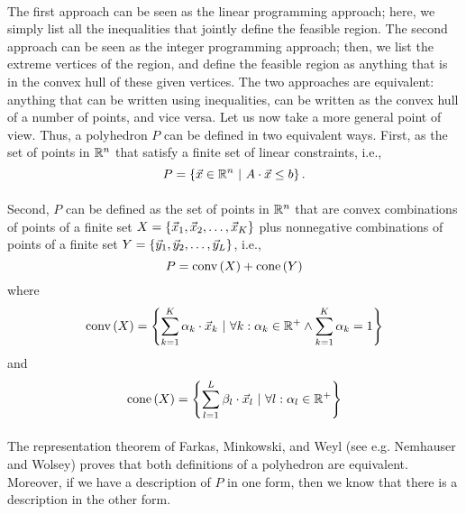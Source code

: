 \documentclass[titlepage]{book}
\theoremstyle{definition}
\begin{document}
\paragraph{}
The first approach can be seen as the linear programming approach; here, we simply list all the inequalities that jointly define the feasible region. The second approach can be seen as the integer programming approach; then, we list the extreme vertices of the region, and define the feasible region as anything that is in the convex hull of these given vertices. The two approaches are equivalent: anything that can be written using inequalities, can be written as the convex hull of a number of points, and vice versa. Let us now take a more general point of view. Thus, a polyhedron $P$ can be defined in two equivalent ways. First, as the set of points in $\RRR^n$ that satisfy a finite set of linear constraints, i.e.,
\begin{equation}
P=\condset{\vec{x}\in\RRR^n}{A\cdot\vec{x}\leq b}.
\end{equation}

\paragraph{}
Second, $P$ can be defined as the set of points in $\RRR^n$ that are convex combinations of points of a finite set $X=\accl{\vec{x}_1,\vec{x}_2,\ldots,\vec{x}_K}$ plus nonnegative combinations of points of a finite set $Y=\accl{\vec{y}_1,\vec{y}_2,\ldots,\vec{y}_L}$, i.e.,
\begin{equation}
P=\funm{conv}{X}+\funm{cone}{Y}
\end{equation}
where
\begin{equation}
\funm{conv}{X}=\condset{\sumieqb[k]{1}{K}{\alpha_k\cdot\vec{x}_k}}{\forall k:\alpha_k\in\RRR^+\wedge\sumieqb[k]{1}{K}{\alpha_k}=1}
\end{equation}
and
\begin{equation}
\funm{cone}{X}=\condset{\sumieqb[l]{1}{L}{\beta_l\cdot\vec{x}_l}}{\forall l:\alpha_l\in\RRR^+}
\end{equation}

\paragraph{}
The representation theorem of Farkas, Minkowski, and Weyl (see e.g. Nemhauser and Wolsey\cite{citeulike:2212037}) proves that both definitions of a polyhedron are equivalent. Moreover, if we have a description of $P$ in one form, then we know that there is a description in the other form.
\end{document}
